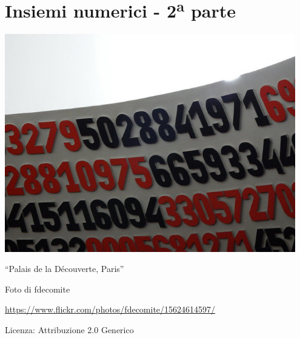 \part{Insiemi numerici - 2\textsuperscript{a} parte}

\includegraphics[width=0.95\textwidth]{img/palais_decouverte.jpg}
  \begin{center}
    {\large ``Palais de la Découverte, Paris''}\par
    Foto di fdecomite\par
    \url{https://www.flickr.com/photos/fdecomite/15624614597/}\par
    Licenza: Attribuzione 2.0 Generico\par
  \end{center}
\clearpage
\cleardoublepage
